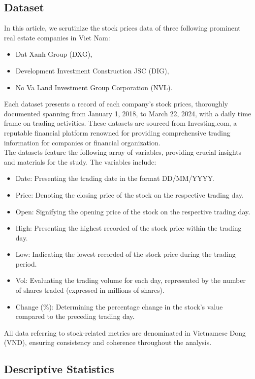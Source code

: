 \documentclass[conference]{IEEEtran}
\begin{document}
\subsection{Dataset}\label{AA}
In this article, we scrutinize the stock prices data of three following prominent real estate companies in Viet Nam:
\begin{itemize}
    \item Dat Xanh Group (DXG),
    \item Development Investment Construction JSC (DIG),
    \item No Va Land Investment Group Corporation (NVL).
\end{itemize}
Each dataset presents a record of each company's stock prices, thoroughly documented spanning from January 1, 2018, to March 22, 2024, with a daily time frame on trading activities. These datasets are sourced from Investing.com, a reputable financial platform renowned for providing comprehensive trading information for companies or financial organization.\\
The datasets feature the following array of variables, providing crucial insights and materials for the study. The variables include:
\begin{itemize}
    \item Date: Presenting the trading date in the format DD/MM/YYYY.
    \item Price: Denoting the closing price of the stock on the respective trading day.
    \item Open: Signifying the opening price of the stock on the respective trading day.
    \item High: Presenting the highest recorded of the stock price within the trading day.
    \item Low: Indicating the lowest recorded of the stock price during the trading period.
    \item Vol: Evaluating the trading volume for each day, represented by the number of shares traded (expressed in millions of shares).
    \item Change (\%): Determining the percentage change in the stock's value compared to the preceding trading day.
\end{itemize}
All data referring to stock-related metrics are denominated in Vietnamese Dong (VND), ensuring consistency and coherence throughout the analysis.

\subsection{Descriptive Statistics}
\end{document}
